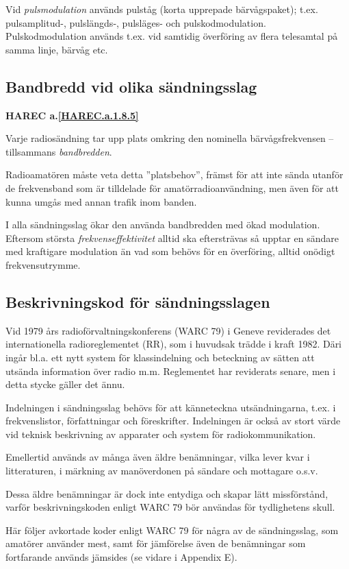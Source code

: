 Vid \emph{pulsmodulation} används pulståg (korta upprepade bärvågspaket); t.ex.
pulsamplitud-, pulslängds-, pulsläges- och pulskodmodulation. Pulskodmodulation
används t.ex. vid samtidig överföring av flera telesamtal på samma linje,
bärvåg etc.

\subsection{Bandbredd vid olika sändningsslag}
\textbf{HAREC a.\ref{HAREC.a.1.8.5}\label{myHAREC.a.1.8.5b}}

Varje radiosändning tar upp plats omkring den nominella bärvågsfrekvensen --
tillsammans \emph{bandbredden}.

Radioamatören måste veta detta ''platsbehov'', främst för att inte sända utanför
de frekvensband som är tilldelade för amatörradioanvändning, men även för att
kunna umgås med annan trafik inom banden.

I alla sändningsslag ökar den använda bandbredden med ökad modulation. Eftersom
största \emph{frekvenseffektivitet} alltid ska eftersträvas så upptar en
sändare med kraftigare modulation än vad som behövs för en överföring, alltid
onödigt frekvensutrymme.

\subsection{Beskrivningskod för sändningsslagen}

Vid 1979 års radioförvaltningskonferens (WARC 79) i Geneve reviderades det
internationella radioreglementet (RR), som i huvudsak trädde i kraft 1982.
Däri ingår bl.a. ett nytt system för klassindelning och beteckning av sätten
att utsända information över radio m.m. Reglementet har reviderats senare, men
i detta stycke gäller det ännu.

Indelningen i sändningsslag behövs för att känneteckna utsändningarna, t.ex. i
frekvenslistor, författningar och föreskrifter. Indelningen är också av stort
värde vid teknisk beskrivning av apparater och system för radiokommunikation.

Emellertid används av många även äldre benämningar, vilka lever kvar i
litteraturen, i märkning av manöverdonen på sändare och mottagare o.s.v.

Dessa äldre benämningar är dock inte entydiga och skapar lätt missförstånd,
varför beskrivningskoden enligt WARC 79 bör användas för tydlighetens skull.

Här följer avkortade koder enligt WARC 79 för några av de sändningsslag, som
amatörer använder mest, samt för jämförelse även de benämningar som fortfarande
används jämsides (se vidare i Appendix E).

